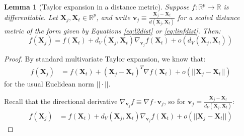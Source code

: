 \documentclass{article}
\newtheorem{lemma}[theorem]{Lemma}
\newcommand{\ddt}{\frac{d}{dt}}
\newcommand{\Xt}{\mathbf{X}_t}
\newcommand{\Xj}{\mathbf{X}_j}
\newcommand{\vj}{\mathbf{v}_j}
\begin{document}
\begin{lemma}[Taylor expansion in a distance metric]
\label{lem:bias}
Suppose $f: \mathbb{R}^p \to \mathbb{R}$ is differentiable.
Let $\Xj, \Xt \in \mathbb{R}^p$, and write $\vj \equiv \frac{\Xj - \Xt}{d(\Xj, \Xt)}$ for a scaled distance metric of the form given by Equations \ref{eq:l2dist} or \ref{eq:linfdist}.
Then:
$$f(\Xj) = f(\Xt) + d_V(\Xj, \Xt) \nabla_{\vj} f(\Xt) + o(d_V(\Xj, \Xt))$$
\end{lemma}
\begin{proof}
    By standard multivariate Taylor expansion, we know that:
    \begin{align*}
        f(\Xj) 
        &= f(\Xt) + (\Xj - \Xt)^T \nabla f(\Xt) + o(||\Xj - \Xt||)
    \end{align*}
    for the usual Euclidean norm $||\cdot||$.
    
    Recall that the directional derivative $\nabla_{\vj} f \equiv \nabla f \cdot \vj$, so for $\vj = \frac{\Xj -\Xt}{d_V(\Xj, \Xt)}$:
    \begin{align*}
        f(\Xj)
        &= f(\Xt) + d_V(\Xj, \Xt) \nabla_{\vj} f(\Xt) + o(||\Xj - \Xt||)
    \end{align*}
    

\end{proof}
\end{document}
